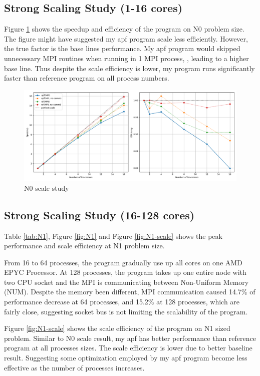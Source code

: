 \documentclass[12pt]{article}
\begin{document}
\subsection{Strong Scaling Study (1-16 cores)}
Figure \ref{fig:N0-scale} shows the speedup and efficiency of the program on N0 problem size.
The figure might have suggested my apf program scale less efficiently.
However, the true factor is the base lines performance.
My apf program would skipped unnecessary MPI routines 
when running in 1 MPI process, 
, leading to a higher base line.
Thus despite the scale efficiency is lower,
my program runs significantly faster than reference program on all process numbers.

\begin{figure}[h]
    \centering
    \includegraphics[width=\textwidth]{img/N0_scale.png}
    \caption{N0 scale study}
    \label{fig:N0-scale}
\end{figure}

\subsection{Strong Scaling Study (16-128 cores)}
Table \ref{tab:N1}, Figure \ref{fig:N1} and Figure \ref{fig:N1-scale} 
shows the peak performance and scale efficiency at N1 problem size.

From 16 to 64 processes, the program gradually use up all cores on one AMD EPYC Processor.
At 128 processes, the program takes up one entire node with two CPU socket
and the MPI is communicating between Non-Uniform Memory (NUM).
Despite the memory been different,
MPI communication caused 14.7\% of performance decrease at 64 processes,  
and 15.2\% at 128 processes, which are fairly close, suggesting 
socket bus is not limiting the scalability of the program.

Figure \ref{fig:N1-scale} shows the scale efficiency of the program on N1 sized problem.
Similar to N0 scale result, my apf has better performance than reference program at all processes sizes.
The scale efficiency is lower due to better baseline result.
Suggesting some optimization employed by my apf program become less effective 
as the number of processes increases.
\end{document}
